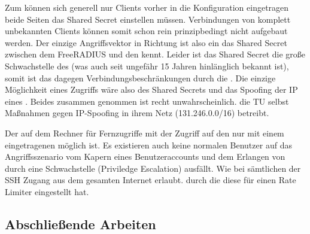 \documentclass[11pt,a4paper,titlepage=firstiscover]{scrartcl} %
\begin{document}

Zum  können sich generell nur Clients  vorher in die Konfiguration eingetragen  beide Seiten das 
Shared Secret einstellen müssen. Verbindungen von komplett unbekannten Clients 
können somit schon rein prinzipbedingt nicht aufgebaut werden. Der einzige 
Angriffsvektor in  Richtung ist also ein  das Shared Secret zwischen dem FreeRADIUS und den  
kennt. Leider ist das Shared Secret die große Schwachstelle des 
 (was auch seit ungefähr 15 Jahren hinlänglich bekannt 
ist), somit ist das  
 dagegen  Verbindungsbeschränkungen 
durch die . Die einzige Möglichkeit eines Zugriffs wäre also 
 des Shared Secrets und 
das Spoofing der IP eines  
. Beides zusammen genommen ist  recht unwahrscheinlich.
die TU selbst Maßnahmen gegen IP-Spoofing in ihrem Netz (131.246.0.0/16) betreibt.

Der   auf dem Rechner für Fernzugriffe  mit der 
   
Zugriff auf den  nur mit einem eingetragenen  
möglich ist. Es existieren auch keine normalen Benutzer auf  
 das Angriffsszenario vom Kapern eines Benutzeraccounts 
und dem  Erlangen von  durch eine 
Schwachstelle (Priviledge Escalation) ausfällt. Wie bei sämtlichen 
 der SSH Zugang aus dem gesamten Internet 
erlaubt.  durch die   diese für 
 einen Rate Limiter eingestellt hat.

\subsection{Abschließende Arbeiten}
\end{document}
